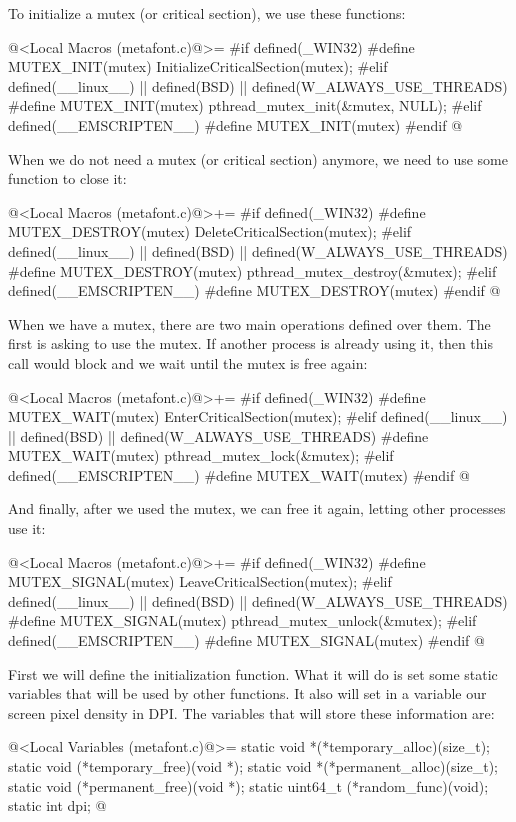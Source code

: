 To initialize a mutex (or critical section), we use these functions:

\iniciocodigo
@<Local Macros (metafont.c)@>=
#if defined(_WIN32)
#define MUTEX_INIT(mutex) InitializeCriticalSection(mutex);
#elif defined(__linux__) || defined(BSD) || defined(W_ALWAYS_USE_THREADS)
#define MUTEX_INIT(mutex) pthread_mutex_init(&mutex, NULL);
#elif defined(__EMSCRIPTEN__)
#define MUTEX_INIT(mutex)
#endif
@
\fimcodigo

When we do not need a mutex (or critical section) anymore, we need to
use some function to close it:

\iniciocodigo
@<Local Macros (metafont.c)@>+=
#if defined(_WIN32)
#define MUTEX_DESTROY(mutex) DeleteCriticalSection(mutex);
#elif defined(__linux__) || defined(BSD) || defined(W_ALWAYS_USE_THREADS)
#define MUTEX_DESTROY(mutex) pthread_mutex_destroy(&mutex);
#elif defined(__EMSCRIPTEN__)
#define MUTEX_DESTROY(mutex)
#endif
@
\fimcodigo

When we have a mutex, there are two main operations defined over
them. The first is asking to use the mutex. If another process is
already using it, then this call would block and we wait until the
mutex is free again:

\iniciocodigo
@<Local Macros (metafont.c)@>+=
#if defined(_WIN32)
#define MUTEX_WAIT(mutex) EnterCriticalSection(mutex);
#elif defined(__linux__) || defined(BSD) || defined(W_ALWAYS_USE_THREADS)
#define MUTEX_WAIT(mutex) pthread_mutex_lock(&mutex);
#elif defined(__EMSCRIPTEN__)
#define MUTEX_WAIT(mutex)
#endif
@
\fimcodigo

And finally, after we used the mutex, we can free it again, letting
other processes use it:

\iniciocodigo
@<Local Macros (metafont.c)@>+=
#if defined(_WIN32)
#define MUTEX_SIGNAL(mutex) LeaveCriticalSection(mutex);
#elif defined(__linux__) || defined(BSD) || defined(W_ALWAYS_USE_THREADS)
#define MUTEX_SIGNAL(mutex) pthread_mutex_unlock(&mutex);
#elif defined(__EMSCRIPTEN__)
#define MUTEX_SIGNAL(mutex)
#endif
@
\fimcodigo



First we will define the initialization function. What it will do is
set some static variables that will be used by other functions. It
also will set in a variable our screen pixel density in DPI. The
variables that will store these information are:

\iniciocodigo
@<Local Variables (metafont.c)@>=
static void *(*temporary_alloc)(size_t);
static void (*temporary_free)(void *);
static void *(*permanent_alloc)(size_t);
static void (*permanent_free)(void *);
static uint64_t (*random_func)(void);
static int dpi;
@
\fimcodigo


